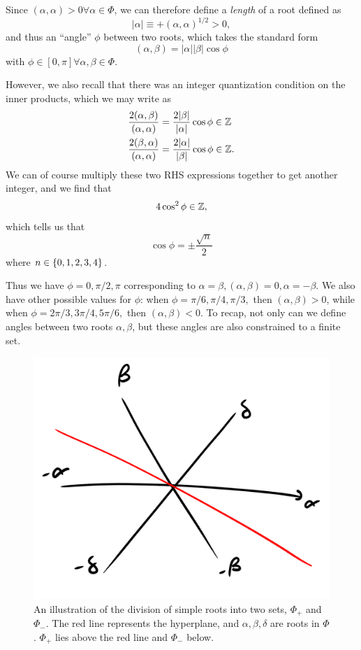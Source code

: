 Since $(\alpha,\alpha)>0 \forall \alpha \in \Phi$, we can therefore define a \emph{length} of a root defined as
$$|\alpha|\equiv +(\alpha,\alpha)^{1/2} >0,$$
and thus an ``angle'' $\phi$ between two roots, which takes the standard form
$$(\alpha,\beta)=|\alpha||\beta|\cos \phi$$
with $\phi\in[0,\pi]\forall \alpha,\beta\in \Phi.$

However, we also recall that there was an integer quantization condition on the inner products, which we may write as
\begin{align}
    \frac{2(\alpha,\beta)}{(\alpha,\alpha)}&=\frac{2|\beta|}{|\alpha|}\cos\phi \in \mathbb{Z}\\
    \frac{2(\beta,\alpha)}{(\alpha,\alpha)}&=\frac{2|\alpha|}{|\beta|}\cos\phi \in \mathbb{Z}.
\end{align}
We can of course multiply these two RHS expressions together to get another integer, and we find that
$$4\cos^2\phi \in \mathbb{Z},$$ which tells us that
$$\cos\phi = \pm \frac{\sqrt{n}}{2}$$ where $n\in\{0,1,2,3,4\}$.

Thus we have $\phi=0,\pi/2,\pi$ corresponding to $\alpha=\beta,(\alpha,\beta)=0,\alpha=-\beta$. We also have other possible values for $\phi$: when $\phi=\pi/6,\pi/4, \pi/3,$ then $(\alpha,\beta)>0$, while when $\phi=2\pi/3,3\pi/4,5\pi/6,$ then $(\alpha,\beta)<0$. To recap, not only can we define angles between two roots $\alpha,\beta$, but these angles are also constrained to a finite set.

\begin{figure}
    \centering
    \includegraphics{2018/11/20181113_simpleroots.png}
    \caption{An illustration of the division of simple roots into two sets, $\Phi_+$ and $\Phi_-$. The red line represents the hyperplane, and $\alpha,\beta,\delta$ are roots in $\Phi$. $\Phi_+$ lies above the red line and $\Phi_-$ below.}
    \label{fig:simpleroots}
\end{figure}

